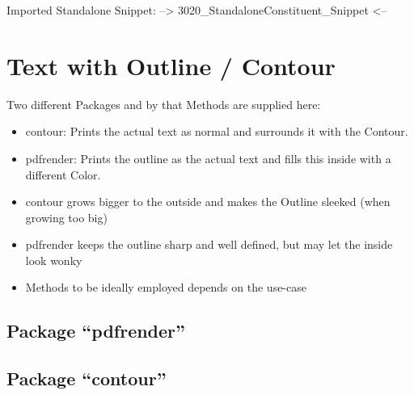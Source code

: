 \np
Imported Standalone Snippet: -->
{3020_StandaloneConstituent_Snippet}
<--


\section{Text with Outline / Contour}
Two different Packages and by that Methods are supplied here:
\begin{itemize}
	\item contour: Prints the actual text as normal and surrounds it with the Contour.
	\item pdfrender: Prints the outline as the actual text and fills this inside with a different Color.
\end{itemize}

\begin{itemize}[labpragA]
	\item contour grows bigger to the outside and makes the Outline sleeked (when growing too big)
	\item pdfrender keeps the outline sharp and well defined, but may let the inside look wonky
\end{itemize}

\begin{itemize}[labpragB]
	\item Methods to be ideally employed depends on the use-case
\end{itemize}

\subsection{Package \enquote{pdfrender}}
{%
	\Huge%
	\sffamily%
	\textcolor{violet}{%
	}\nl%
	\textcolor{violet}{%
	}%
}%

\subsection{Package \enquote{contour}}
{%
	\LARGE%
	\contourlength{\DenKrOutlineWidth}%
	\nl%
	{%
		\contourlength{0.2em}%
		\nl%
		\nl%
	}%
	\nl%
}%



